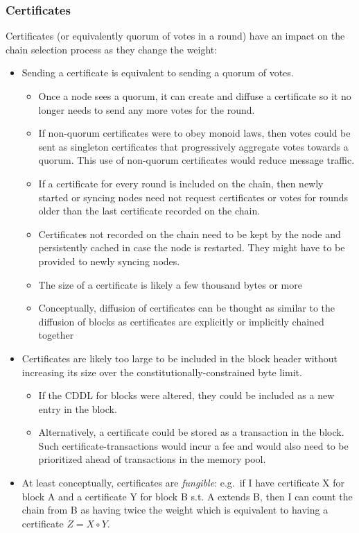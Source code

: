 \documentclass[10pt]{article}
\providecommand{\tightlist}{%
  \setlength{\itemsep}{0pt}\setlength{\parskip}{0pt}}
\begin{document}
\subsubsection{Certificates}\label{certificates-1}

Certificates (or equivalently quorum of votes in a round) have an impact
on the chain selection process as they change the weight:

\begin{itemize}
\tightlist
\item
  Sending a certificate is equivalent to sending a quorum of votes.

  \begin{itemize}
  \tightlist
  \item
    Once a node sees a quorum, it can create and diffuse a certificate
    so it no longer needs to send any more votes for the round.
  \item
    If non-quorum certificates were to obey monoid laws, then votes
    could be sent as singleton certificates that progressively aggregate
    votes towards a quorum. This use of non-quorum certificates would
    reduce message traffic.
  \item
    If a certificate for every round is included on the chain, then
    newly started or syncing nodes need not request certificates or
    votes for rounds older than the last certificate recorded on the
    chain.
  \item
    Certificates not recorded on the chain need to be kept by the node
    and persistently cached in case the node is restarted. They might
    have to be provided to newly syncing nodes.
  \item
    The size of a certificate is likely a few thousand bytes or more
  \item
    Conceptually, diffusion of certificates can be thought as similar to
    the diffusion of blocks as certificates are explicitly or implicitly
    chained together
  \end{itemize}
\item
  Certificates are likely too large to be included in the block header
  without increasing its size over the constitutionally-constrained byte
  limit.

  \begin{itemize}
  \tightlist
  \item
    If the CDDL for blocks were altered, they could be included as a new
    entry in the block.
  \item
    Alternatively, a certificate could be stored as a transaction in the
    block. Such certificate-transactions would incur a fee and would
    also need to be prioritized ahead of transactions in the memory
    pool.
  \end{itemize}
\item
  At least conceptually, certificates are \emph{fungible}: e.g.~if I
  have certificate X for block A and a certificate Y for block B s.t. A
  extends B, then I can count the chain from B as having twice the
  weight which is equivalent to having a certificate \(Z = X \circ Y\).


\end{itemize}
\end{document}
